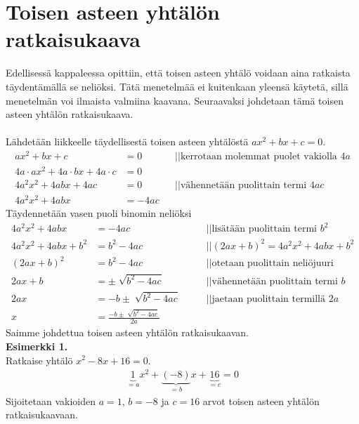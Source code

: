 \chapter{Toisen asteen yhtälön ratkaisukaava}
Edellisessä kappaleessa opittiin, että toisen asteen yhtälö voidaan aina ratkaista täydentämällä se neliöksi. Tätä menetelmää ei kuitenkaan yleensä käytetä, sillä menetelmän voi ilmaista valmiina kaavana. Seuraavaksi johdetaan tämä toisen asteen yhtälön ratkaisukaava. \\ \\

Lähdetään liikkeelle täydellisestä toisen asteen yhtälöstä $ax^2+bx+c=0$.
\begin{align*}
ax^2+bx+c&=0 \ \ \ \ \ &&|| \text{kerrotaan molemmat puolet vakiolla }4a \\
4a \cdot ax^2+4a \cdot bx + 4a \cdot c&=0 \\
4a^2x^2+4abx+4ac&=0 \ \ \ \ \ &&|| \text{vähennetään puolittain termi }4ac  \\
4a^2x^2+4abx&=-4ac
\end{align*}
Täydennetään vasen puoli binomin neliöksi
\begin{align*}
4a^2x^2+4abx&=-4ac \ \ \ \ \ &&|| \text{lisätään puolittain termi } b^2 \\
4a^2x^2+4abx+b^2&=b^2-4ac \ \ \ \ \ &&||(2ax+b)^2=4a^2x^2+4abx+b^2 \\
(2ax+b)^2&=b^2-4ac  \ \ \ \ \ &&||\text{otetaan puolittain neliöjuuri } \\
2ax+b&= \pm \sqrt[]{b^2-4ac} \ \ \ \ \ &&||\text{vähennetään puolittain termi } b \\
2ax&=-b \pm \sqrt[]{b^2-4ac} \ \ \ \ \ &&||\text{jaetaan puolittain termillä } 2a \\
x&= \frac{-b \pm \sqrt[]{b^2-4ac}}{2a} 
\end{align*}
Saimme johdettua toisen asteen yhtälön ratkaisukaavan. \\ 
\textbf{Esimerkki 1.}  \\
Ratkaise yhtälö $x^2-8x+16=0$.
\begin{align*}
\underbrace{1}_{=a}x^2 +\underbrace{(-8)}_{=b}x+\underbrace{16}_{=c}=0
\end{align*}
Sijoitetaan vakioiden $a=1$, $b=-8$ ja $c=16$ arvot toisen asteen yhtälön ratkaisukaavaan.
